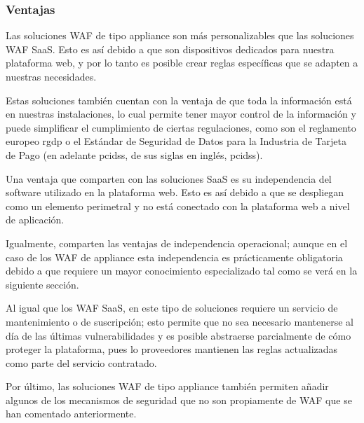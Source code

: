 \subsubsection{Ventajas}
\par Las soluciones WAF de tipo appliance son más personalizables que las soluciones WAF SaaS. Esto es así debido a que son 
dispositivos dedicados para nuestra plataforma web, y por lo tanto es posible crear reglas específicas que se adapten a nuestras necesidades.
\par Estas soluciones también cuentan con la ventaja de que toda la información está en nuestras instalaciones, lo cual permite tener mayor
control de la información y puede simplificar el cumplimiento de ciertas regulaciones, como son el reglamento europeo \acrshort{rgdp} o el
Estándar de Seguridad de Datos para la Industria de Tarjeta de Pago (en adelante \acrshort{pcidss}, de sus siglas en inglés, \acrlong{pcidss}).
\par Una ventaja que comparten con las soluciones SaaS es su independencia del software utilizado en la plataforma web. Esto es así debido a
que se despliegan como un elemento perimetral y no está conectado con la plataforma web a nivel de aplicación.
\par Igualmente, comparten las ventajas de independencia operacional; aunque en el caso de los WAF de appliance esta independencia es
prácticamente obligatoria debido a que requiere un mayor conocimiento especializado tal como se verá en la siguiente sección.
\par Al igual que los WAF SaaS, en este tipo de soluciones requiere un servicio de mantenimiento o de suscripción; esto permite que no sea
necesario mantenerse al día de las últimas vulnerabilidades y es posible abstraerse parcialmente de cómo proteger la plataforma, pues lo
proveedores mantienen las reglas actualizadas como parte del servicio contratado.
\par Por último, las soluciones WAF de tipo appliance también permiten añadir algunos de los mecanismos de seguridad que no son propiamente
de WAF que se han comentado anteriormente.

